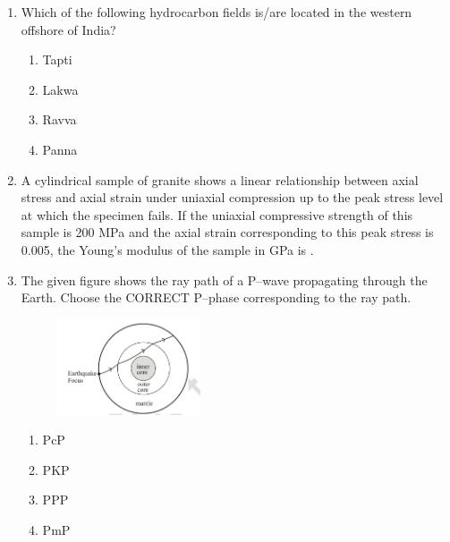 \documentclass[journal,12pt,onecolumn]{IEEEtran}
\begin{document}
\begin{enumerate}
\item Which of the following hydrocarbon fields is/are located in the western offshore of India?

\hfill{}

\begin{multicols}{2}
\begin{enumerate}
    \item Tapti
    \item Lakwa
    \item Ravva
    \item Panna
\end{enumerate}
\end{multicols}

\item A cylindrical sample of granite  shows a linear relationship between axial stress and axial strain under uniaxial compression up to the peak stress level at which the specimen fails. If the uniaxial compressive strength of this sample is 200 MPa and the axial strain corresponding to this peak stress is 0.005, the Young’s modulus of the sample in GPa is \underline{\hspace{1.5cm}} .

\hfill{}




\item The given figure shows the ray path of a P–wave propagating through the Earth. Choose the CORRECT P–phase corresponding to the ray path.

\begin{figure}[h!]
    \centering
    \includegraphics[width=0.4\textwidth]{figs/fig4.png}
    \caption{}
    \label{fig:q18}
\end{figure}


\hfill{}

\begin{multicols}{4}
\begin{enumerate}
    \item PcP
    \item PKP
    \item PPP
    \item PmP
\end{enumerate}
\end{multicols}


\end{enumerate}
\end{document}
